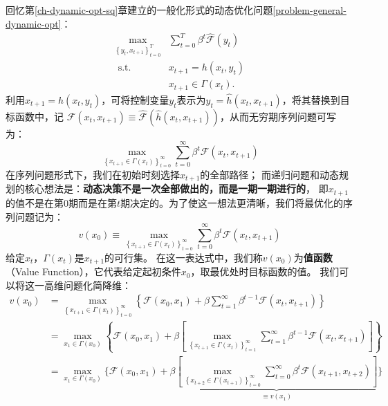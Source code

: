 回忆第\ref{ch-dynamic-opt-sq}章建立的一般化形式的动态优化问题\cref{problem-general-dynamic-opt}：
\begin{equation*}
    \begin{aligned}
        \max _{\left\{y_t, x_{t+1}\right\}_{t=0}^T} & \sum_{t=0}^T \beta^t \hat{\mathcal{F}}\left(y_t\right) \\
        \text { s.t. } & x_{t+1}=h\left(x_t, y_t\right) \\
        & x_{t+1} \in \Gamma\left(x_t\right) .
    \end{aligned}
\end{equation*}
利用$x_{t+1}=h(x_t,y_t)$，可将控制变量$y_t$表示为$y_t = \hat{h}(x_t,x_{t+1})$，将其替换到目标函数中，记
$\mathcal{F}(x_t,x_{t+1})\equiv \hat{\mathcal{F}}\left(\hat{h}(x_t,x_{t+1})\right)$，从而无穷期序列问题可写为：
\begin{equation*}
    \max _{\left\{x_{t+1} \in \Gamma\left(x_t\right)\right\}_{t=0}^{\infty}}
        \sum_{t=0}^{\infty} \beta^t \mathcal{F}\left(x_t, x_{t+1}\right)
\end{equation*}
在序列问题形式下，我们在初始时刻选择$x_{t+1}$的全部路径；
而递归问题和动态规划的核心想法是：\textbf{动态决策不是一次全部做出的，而是一期一期进行的}，
即$x_{t+1}$的值不是在第0期而是在第$t$期决定的。为了使这一想法更清晰，我们将最优化的序列问题记为：
\begin{equation}    \label{eq-def-value-func}
    v\left(x_0\right) \equiv 
        \max _{\left\{x_{t+1} \in \Gamma\left(x_t\right)\right\}_{t=0}^{\infty}} 
        \sum_{t=0}^{\infty} \beta^t \mathcal{F}\left(x_t, x_{t+1}\right)
\end{equation}
给定$x_t$，$\Gamma(x_t)$是$x_{t+1}$的可行集。
在这一表达式中，我们称$v(x_0)$为\textbf{值函数}（Value Function），它代表给定起初条件$x_0$，取最优处时目标函数的值。
我们可以将这一高维问题化简降维：
\begin{equation}
    \begin{aligned}
        v\left(x_0\right) &= \max _{\left\{x_{t+1} \in \Gamma\left(x_t\right)\right\}_{t=0}^{\infty}}
            \left\{\mathcal{F}\left(x_0, x_1\right) + 
                \beta \sum_{t=1}^{\infty} \beta^{t-1} \mathcal{F}\left(x_t, x_{t+1}\right)\right\} \\
        &= \max _{x_1 \in \Gamma\left(x_0\right)}
            \left\{\mathcal{F}\left(x_0, x_1\right) + 
                \beta\left[\max _{\left\{x_{t+1} \in \Gamma\left(x_t\right)\right\}_{t=1}^{\infty}} 
                    \sum_{t=1}^{\infty} \beta^{t-1} \mathcal{F}\left(x_t, x_{t+1}\right)\right]\right\} \\
        &= \max _{x_1 \in \Gamma\left(x_0\right)}
            \{\mathcal{F}\left(x_0, x_1\right) + 
                \beta \underbrace{\left[\max _{\left\{x_{t+2} \in \Gamma\left(x_{t+1}\right)\right\}_{t=0}^{\infty}}
                    \sum_{t=0}^{\infty}\beta^t\mathcal{F}\left(x_{t+1},x_{t+2}\right)\right]}_{\equiv v\left(x_1\right)}\}
    \end{aligned}
\end{equation}
